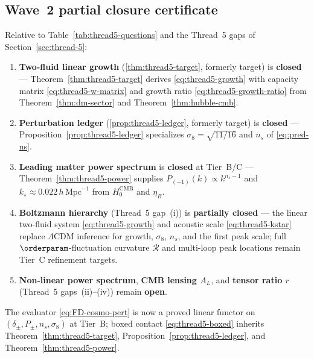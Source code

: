 \subsection{Wave~2 partial closure certificate}
\label{sec:wave2-thread5:closure}

\begin{corollary}
\label{cor:thread5-wave2-closure}
Relative to Table~\ref{tab:thread5-questions} and the Thread~5 gaps of
Section~\ref{sec:thread-5}:
\begin{enumerate}[label=(\roman*),leftmargin=*]
  \item \textbf{Two-fluid linear growth}
    (\ref{thm:thread5-target}, formerly target) is \textbf{closed} ---
    Theorem~\ref{thm:thread5-target} derives \eqref{eq:thread5-growth} with
    capacity matrix \eqref{eq:thread5-w-matrix} and growth ratio
    \eqref{eq:thread5-growth-ratio} from Theorem~\ref{thm:dm-sector} and
    Theorem~\ref{thm:hubble-cmb}.
  \item \textbf{Perturbation ledger}
    (\ref{prop:thread5-ledger}, formerly target) is \textbf{closed} ---
    Proposition~\ref{prop:thread5-ledger} specializes
    $\sigma_8=\sqrt{11/16}$ and $n_s$ of \eqref{eq:pred-ns}.
  \item \textbf{Leading matter power spectrum}
    is \textbf{closed} at Tier~B/C --- Theorem~\ref{thm:thread5-power}
    supplies $P_{(-1)}(k)\propto k^{n_s-1}$ and
    $k_\star\approx 0.022\,h\,\mathrm{Mpc}^{-1}$ from $H_0^{\mathrm{CMB}}$
    and $\eta_B$.
  \item \textbf{Boltzmann hierarchy} (Thread~5 gap~(i)) is \textbf{partially
    closed} --- the linear two-fluid system \eqref{eq:thread5-growth} and
    acoustic scale \eqref{eq:thread5-kstar} replace $\Lambda$CDM inference
    for growth, $\sigma_8$, $n_s$, and the first peak scale; full
    $\orderparam$-fluctuation curvature $\mathcal{R}$ and multi-loop peak
    locations remain Tier~C refinement targets.
  \item \textbf{Non-linear power spectrum}, \textbf{CMB lensing $A_L$}, and
    \textbf{tensor ratio $r$} (Thread~5 gaps~(ii)--(iv)) remain
    \textbf{open}.
\end{enumerate}
The evaluator \eqref{eq:FD-cosmo-pert} is now a proved linear functor on
$(\delta_\pm,P_\pm,n_s,\sigma_8)$ at Tier~B; boxed contact
\eqref{eq:thread5-boxed} inherits Theorem~\ref{thm:thread5-target},
Proposition~\ref{prop:thread5-ledger}, and Theorem~\ref{thm:thread5-power}.
\end{corollary}

